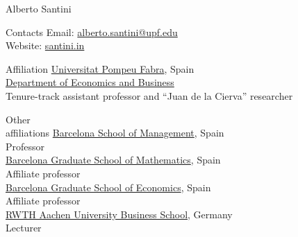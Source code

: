 \documentclass[12pt,table]{article}
\newcommand{\cvImportant}[1]{\textcolor{cvblue}{#1}}
\begin{document}

  {\huge\TitleFont Alberto Santini}

  \vspace{2em}

  \begin{paracol}{2}
    {\TitleFont Contacts}
  \switchcolumn
    Email: \href{mailto:alberto.santini@upf.edu}{alberto.santini@upf.edu}\\
    Website: \href{https://santini.in/}{santini.in}
  \end{paracol}

  \vspace{0.5em}

  \begin{paracol}{2}
    {\TitleFont Affiliation}
  \switchcolumn
    \cvImportant{\href{https://www.upf.edu/}{Universitat Pompeu Fabra}, Spain}\\
    \href{https://www.upf.edu/en/web/econ/entry/-/-/153125/adscripcion/alberto-santini}{Department of Economics and Business}\\
    Tenure-track assistant professor and ``Juan de la Cierva'' researcher
  \end{paracol}

  \begin{paracol}{2}
    {\TitleFont Other\\affiliations}
  \switchcolumn
    \cvImportant{\href{https://www.bsm.upf.edu/}{Barcelona School of Management}, Spain}\\
    Professor \\[1em]
    \cvImportant{\href{https://bgsmath.cat/}{Barcelona Graduate School of Mathematics}, Spain}\\
    Affiliate professor \\[1em]
    \cvImportant{\href{https://barcelonagse.edu/}{Barcelona Graduate School of Economics}, Spain}\\
    Affiliate professor\\[1em]
    \cvImportant{\href{https://www.business-school.rwth-aachen.de/}{RWTH Aachen University Business School}, Germany}\\
    Lecturer\\[1em]
  \end{paracol}

  
  
  
  
  
  
  
  
  
  
  
\end{document}
